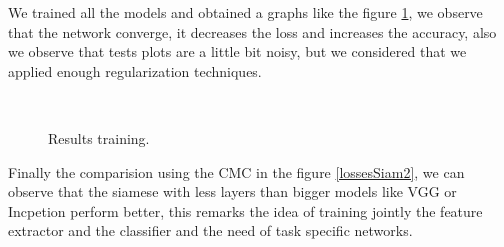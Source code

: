\documentclass[12pt, a4paper, titlepage,twoside,openright]{article}
\begin{document}
We trained all the models and obtained a graphs like the figure \ref{lossesSiam}, we observe that the network converge, it decreases the loss and increases the accuracy, also we observe that tests plots are a little bit noisy, but we considered that we applied enough regularization techniques.

\begin{figure}[H]
		
\centering

\\

\caption{Results training.}
\label{lossesSiam}
\end{figure}



Finally the comparision using the CMC in the figure \ref{lossesSiam2}, we can observe that the siamese with less layers than bigger models like VGG or Incpetion perform better, this remarks the idea of training jointly the feature extractor and the classifier and the need of task specific networks.
\end{document}
